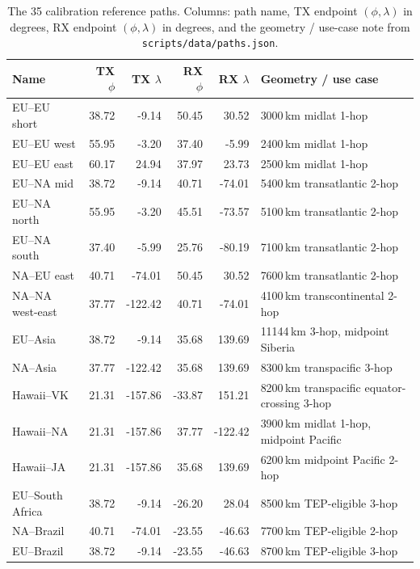 \documentclass[11pt,a4paper]{article}
\begin{document}
\begin{table}[H]
\centering
\small
\caption{The 35 calibration reference paths.  Columns: path name,
TX endpoint $(\phi, \lambda)$ in degrees, RX endpoint $(\phi, \lambda)$
in degrees, and the geometry / use-case note from
\texttt{scripts/data/paths.json}.}
\label{tab:paths}
\begin{tabular}{@{}lrrrrl@{}}
\toprule
\textbf{Name} & \textbf{TX $\phi$} & \textbf{TX $\lambda$}
              & \textbf{RX $\phi$} & \textbf{RX $\lambda$}
              & \textbf{Geometry / use case} \\
\midrule
EU--EU short      &  38.72 &   -9.14 &  50.45 &   30.52 & 3000\,km midlat 1-hop \\
EU--EU west       &  55.95 &   -3.20 &  37.40 &   -5.99 & 2400\,km midlat 1-hop \\
EU--EU east       &  60.17 &   24.94 &  37.97 &   23.73 & 2500\,km midlat 1-hop \\
EU--NA mid        &  38.72 &   -9.14 &  40.71 &  -74.01 & 5400\,km transatlantic 2-hop \\
EU--NA north      &  55.95 &   -3.20 &  45.51 &  -73.57 & 5100\,km transatlantic 2-hop \\
EU--NA south      &  37.40 &   -5.99 &  25.76 &  -80.19 & 7100\,km transatlantic 2-hop \\
NA--EU east       &  40.71 &  -74.01 &  50.45 &   30.52 & 7600\,km transatlantic 2-hop \\
NA--NA west-east  &  37.77 & -122.42 &  40.71 &  -74.01 & 4100\,km transcontinental 2-hop \\
EU--Asia          &  38.72 &   -9.14 &  35.68 &  139.69 & 11144\,km 3-hop, midpoint Siberia \\
NA--Asia          &  37.77 & -122.42 &  35.68 &  139.69 & 8300\,km transpacific 3-hop \\
Hawaii--VK        &  21.31 & -157.86 & -33.87 &  151.21 & 8200\,km transpacific equator-crossing 3-hop \\
Hawaii--NA        &  21.31 & -157.86 &  37.77 & -122.42 & 3900\,km midlat 1-hop, midpoint Pacific \\
Hawaii--JA        &  21.31 & -157.86 &  35.68 &  139.69 & 6200\,km midpoint Pacific 2-hop \\
EU--South Africa  &  38.72 &   -9.14 & -26.20 &   28.04 & 8500\,km TEP-eligible 3-hop \\
NA--Brazil        &  40.71 &  -74.01 & -23.55 &  -46.63 & 7700\,km TEP-eligible 2-hop \\
EU--Brazil        &  38.72 &   -9.14 & -23.55 &  -46.63 & 8700\,km TEP-eligible 3-hop \\

\end{tabular}
\end{table}
\end{document}
